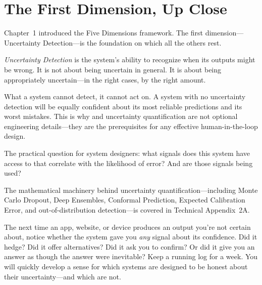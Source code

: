 \section{The First Dimension, Up Close}

Chapter~1 introduced the Five Dimensions framework. The first dimension---Uncertainty Detection---is the foundation on which all the others rest.

\emph{Uncertainty Detection} is the system's ability to recognize when its outputs might be wrong. It is not about being uncertain in general. It is about being appropriately uncertain---in the right cases, by the right amount.

What a system cannot detect, it cannot act on. A system with no uncertainty detection will be equally confident about its most reliable predictions and its worst mistakes. This is why  and uncertainty quantification are not optional engineering details---they are the prerequisites for any effective human-in-the-loop design.

The practical question for system designers: what signals does this system have access to that correlate with the likelihood of error? And are those signals being used?

\begin{technote}
The mathematical machinery behind uncertainty quantification---including Monte Carlo Dropout, Deep Ensembles, Conformal Prediction, Expected Calibration Error, and out-of-distribution detection---is covered in Technical Appendix~2A.
\end{technote}


\begin{trythis}
The next time an app, website, or device produces an output you're not certain about, notice whether the system gave you \emph{any} signal about its confidence. Did it hedge? Did it offer alternatives? Did it ask you to confirm? Or did it give you an answer as though the answer were inevitable? Keep a running log for a week. You will quickly develop a sense for which systems are designed to be honest about their uncertainty---and which are not.
\end{trythis}

